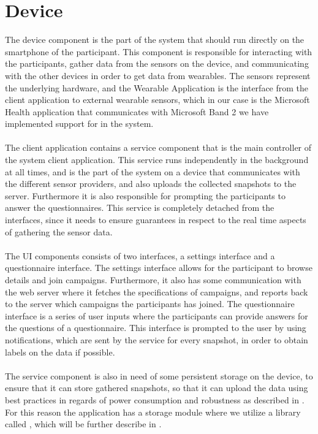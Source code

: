 
\section{Device}
\label{sec:device}
The device component is the part of the system that should run directly on the smartphone of the participant. This component is responsible for interacting with the participants, gather data from the sensors on the device, and communicating with the other devices in order to get data from wearables. The sensors represent the underlying hardware, and the Wearable Application is the interface from the client application to external wearable sensors, which in our case is the Microsoft Health application that communicates with Microsoft Band 2 we have implemented support for in the system.
\\\\
The client application contains a service component that is the main controller of the system client application. This service runs independently in the background at all times, and is the part of the system on a device that communicates with the different sensor providers, and also uploads the collected snapshots to the server. Furthermore it is also responsible for prompting the participants to answer the questionnaires. This service is completely detached from the interfaces, since it needs to ensure guarantees in respect to the real time aspects of gathering the sensor data.
\\\\
The UI components consists of two interfaces, a settings interface and a questionnaire interface. The settings interface allows for the participant to browse details and join campaigns. Furthermore, it also has some communication with the web server where it fetches the specifications of campaigns, and reports back to the server which campaigns the participants has joined. The questionnaire interface is a series of user inputs where the participants can provide answers for the questions of a questionnaire. This interface is prompted to the user by using notifications, which are sent by the service for every snapshot, in order to obtain labels on the data if possible.
\\\\
The service component is also in need of some persistent storage on the device, to ensure that it can store gathered snapshots, so that it can upload the data using best practices in regards of power consumption and robustness as described in . For this reason the application has a storage module where we utilize a library called , which will be further describe in .

